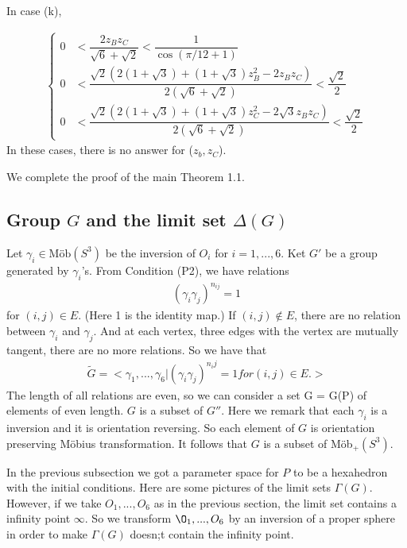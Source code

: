 \documentclass[dvipdfmx]{interact}
\theoremstyle{plain}%
\theoremstyle{definition}
\theoremstyle{remark}
\theoremstyle{problemstyle}
\begin{document}
In case (k),

\begin{align*}
 \begin{cases}
  0 &< \dfrac{2z_Bz_C}{\sqrt{6} + \sqrt{2}} < \dfrac{1}{\cos(\pi/12+1)}\\
  0 &< \dfrac{\sqrt{2}(2 (1 + \sqrt{3}) + (1 + \sqrt{3})z^2_B -2z_Bz_C)}
  {2(\sqrt{6} + \sqrt{2})} < \dfrac{\sqrt{2}}{2}\\
  0 &< \dfrac{\sqrt{2}(2 (1 + \sqrt{3}) + (1 + \sqrt{3})z^2_C
  -2\sqrt{3}z_Bz_C)}
  {2(\sqrt{6} + \sqrt{2})} < \dfrac{\sqrt{2}}{2}
 \end{cases}
\end{align*}
In these cases, there is no answer for ($z_b, z_C$).

We complete the proof of the main Theorem 1.1.

\subsection{Group $G$ and the limit set $\Delta(G)$}
Let $\gamma_i \in \text{M\"ob}(S^3)$ be the inversion of $O_i$ for $i =
1,...,6$.
Ket $G'$ be a group generated by $\gamma_i$'s. From Condition (P2), we
have relations
\begin{align*}
 (\gamma_i \gamma_j)^{n_{ij}} = 1
\end{align*}
for $(i, j) \in E.$ (Here 1 is the identity map.) If $(i, j) \notin E$,
there are no relation between $\gamma_i$ and $\gamma_j$.
And at each vertex, three edges with the vertex are mutually tangent,
there are no more relations. So we have that
\begin{align*}
 \tilde G = <\gamma_1, ...,\gamma_6 | (\gamma_i\gamma_j)^{n_ij} = 1 for
 (i, j) \in E.>
\end{align*}
The length of all relations are even, so we can consider a set G = G(P)
of elements of even length. $G$ is a subset of $G''$. Here we remark
that each $\gamma_i$ is a inversion and it is orientation reversing. So
each element of $G$ is orientation preserving M\"obius transformation.
It follows that $G$ is a subset of M\"ob$_+(S^3)$.

In the previous subsection we got a parameter space for $P$ to be a
hexahedron with the initial conditions. Here are some pictures of the
limit sets $\Gamma(G)$. However, if we take $O_1, ..., O_6$ as in the
previous section, the limit set contains a infinity point $\infty$. So
we transform $\O_1, ..., O_6$ by an inversion of a proper sphere in
order to make $\Gamma(G)$ doesn;t contain the infinity point.
\end{document}
